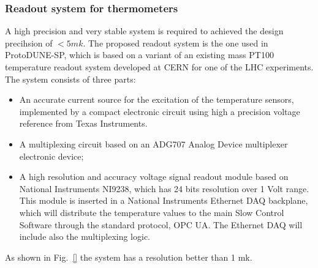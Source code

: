 \subsubsection{Readout system for thermometers}
\label{sec:fdsp-slow-cryo-therm-readout}

A high precision and very stable system is required to achieved the design precihsion of $< 5 mk$.
The proposed readout system is the one used in ProtoDUNE-SP, which is based on a variant of an existing mass PT100 temperature readout system developed at
CERN for one of the LHC experiments. The system consists of three parts:
\begin{itemize}
\item An accurate current source for the excitation of the temperature sensors, implemented by a compact electronic circuit using high a precision voltage reference from Texas Instruments. 
\item A multiplexing circuit based on an ADG707 Analog Device multiplexer electronic device;
\item A high resolution and accuracy voltage signal readout module based on National Instruments NI9238, which has 24 bits resolution over 1 Volt range.
  This module is inserted in a National Instruments Ethernet DAQ backplane, which will distribute the temperature values to the main Slow Control Software
  through the standard protocol, OPC UA. The Ethernet DAQ will include also the multiplexing logic.
\end{itemize}

As shown in Fig.~\ref{} the system has a resolution better than 1 mk.  
